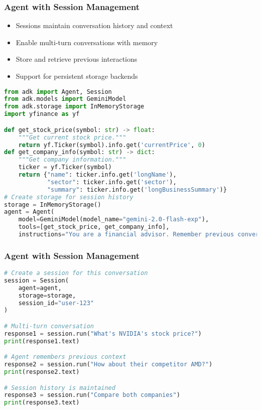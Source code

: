 \begin{frame}[fragile]\frametitle{Agent with Session Management}
      \begin{itemize}
	\item Sessions maintain conversation history and context
	\item Enable multi-turn conversations with memory
	\item Store and retrieve previous interactions
	\item Support for persistent storage backends
	  \end{itemize}
      
      \begin{lstlisting}[language=python, basicstyle=\tiny]
from adk import Agent, Session
from adk.models import GeminiModel
from adk.storage import InMemoryStorage
import yfinance as yf

def get_stock_price(symbol: str) -> float:
    """Get current stock price."""
    return yf.Ticker(symbol).info.get('currentPrice', 0)
def get_company_info(symbol: str) -> dict:
    """Get company information."""
    ticker = yf.Ticker(symbol)
    return {"name": ticker.info.get('longName'),
            "sector": ticker.info.get('sector'),
            "summary": ticker.info.get('longBusinessSummary')}
# Create storage for session history
storage = InMemoryStorage()
agent = Agent(
    model=GeminiModel(model_name="gemini-2.0-flash-exp"),
    tools=[get_stock_price, get_company_info],
    instructions="You are a financial advisor. Remember previous conversations.")
      \end{lstlisting}
\end{frame}


\begin{frame}[fragile]\frametitle{Agent with Session Management}

      \begin{lstlisting}[language=python, basicstyle=\tiny]
# Create a session for this conversation
session = Session(
    agent=agent,
    storage=storage,
    session_id="user-123"
)

# Multi-turn conversation
response1 = session.run("What's NVIDIA's stock price?")
print(response1.text)

# Agent remembers previous context
response2 = session.run("How about their competitor AMD?")
print(response2.text)

# Session history is maintained
response3 = session.run("Compare both companies")
print(response3.text)
      \end{lstlisting}
\end{frame}


